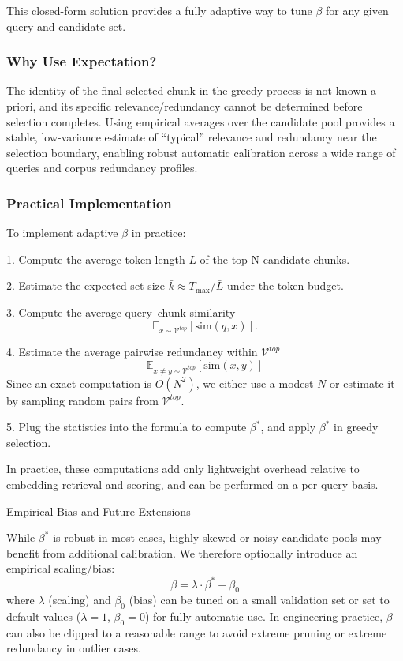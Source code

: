 \documentclass[11pt]{article}
\begin{document}
This closed-form solution provides a fully adaptive way to tune $\beta$ for any given query and candidate set.

\subsubsection{Why Use Expectation?}


The identity of the final selected chunk in the greedy process is not known a priori, and its specific relevance/redundancy cannot be determined before selection completes. Using empirical averages over the candidate pool provides a stable, low-variance estimate of “typical” relevance and redundancy near the selection boundary, enabling robust automatic calibration across a wide range of queries and corpus redundancy profiles.

\subsubsection{Practical Implementation}

To implement adaptive $\beta$ in practice:

1. Compute the average token length $\bar{L}$ of the top-N candidate chunks.

2. Estimate the expected set size $\bar{k} \approx T_{\max} / \bar{L}$ under the token budget.

3. Compute the average query–chunk similarity
$$\mathbb{E}_{x \sim \mathcal{V}^{top}} [\mathrm{sim}(q, x)].$$

4. Estimate the average pairwise redundancy within $\mathcal{V}^{top}$
$$\mathbb{E}_{x \neq y \sim \mathcal{V}^{top}} [\mathrm{sim}(x, y)]$$
	Since an exact computation is $O(N^2)$, we either use a modest $N$ or estimate it by sampling random pairs from $\mathcal{V}^{top}$.

5. Plug the statistics into the formula to compute $\beta^*$, and apply $\beta^*$ in greedy selection.

In practice, these computations add only lightweight overhead relative to embedding retrieval and scoring, and can be performed on a per-query basis.

Empirical Bias and Future Extensions

While $\beta^*$ is robust in most cases, highly skewed or noisy candidate pools may benefit from additional calibration. We therefore optionally introduce an empirical scaling/bias:
$$\beta = \lambda \cdot \beta^* + \beta_0$$
where $\lambda$ (scaling) and $\beta_0$ (bias) can be tuned on a small validation set or set to default values ($\lambda=1$, $\beta_0=0$) for fully automatic use. In engineering practice, $\beta$ can also be clipped to a reasonable range to avoid extreme pruning or extreme redundancy in outlier cases.
\end{document}
